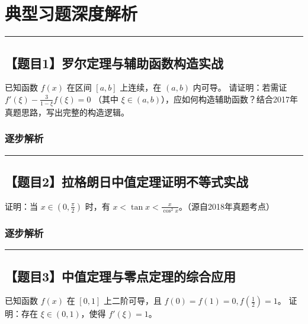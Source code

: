 \documentclass[UTF8]{ctexart}
\newenvironment{redenv}{\color{red}}{}
\newcommand{\problemrule}{\noindent\rule{\textwidth}{1.5pt}\vspace{-0.8em}}
\begin{document}
\newpage
\section{典型习题深度解析}

\problemrule
\subsection*{【题目1】罗尔定理与辅助函数构造实战}
已知函数 $f(x)$ 在区间 $[a, b]$ 上连续，在 $(a, b)$ 内可导。
请证明：若需证 $f'(\xi) - \frac{3}{1-\xi}f(\xi) = 0$ （其中 $\xi \in (a, b)$），应如何构造辅助函数？结合2017年真题思路，写出完整的构造逻辑。

\begin{redenv}
\subsubsection*{逐步解析}
\vspace{3cm} %
\end{redenv}

\vspace{2em}
\problemrule
\subsection*{【题目2】拉格朗日中值定理证明不等式实战}
证明：当 $x \in (0, \frac{\pi}{2})$ 时，有 $x < \tan x < \frac{x}{\cos^2 x}$。（源自2018年真题考点）

\begin{redenv}
\subsubsection*{逐步解析}
\vspace{8cm} %
\end{redenv}

\vspace{2em}
\problemrule
\subsection*{【题目3】中值定理与零点定理的综合应用}
已知函数 $f(x)$ 在 $[0, 1]$ 上二阶可导，且 $f(0)=f(1)=0, f(\frac{1}{2})=1$。
证明：存在 $\xi \in (0, 1)$，使得 $f'(\xi) = 1$。
\end{document}
